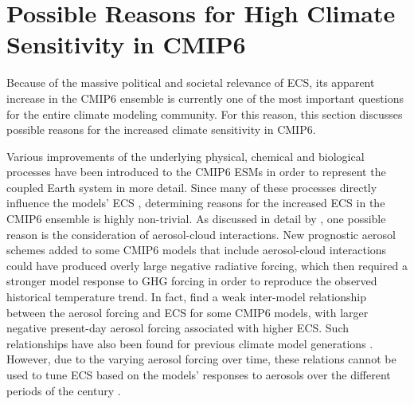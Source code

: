\section{Possible Reasons for High Climate Sensitivity in \acs{CMIP}6}
\label{sec:04:possible_reasons_high_ecs_cmip6}

Because of the massive political and societal relevance of \ac{ECS}, its
apparent increase in the \acs{CMIP}6 ensemble is currently one of the most
important questions for the entire climate modeling community. For this reason,
this section discusses possible reasons for the increased climate sensitivity
in \acs{CMIP}6.

Various improvements of the underlying physical, chemical and biological
processes have been introduced to the \acs{CMIP}6 \acp{ESM} in order to
represent the coupled Earth system in more detail. Since many of these
processes directly influence the models' \ac{ECS} \autocite{Forster2020},
determining reasons for the increased \ac{ECS} in the \acs{CMIP}6 ensemble is
highly non-trivial. As discussed in detail by \textcite{Meehl2020}, one
possible reason is the consideration of aerosol-cloud interactions. New
prognostic aerosol schemes added to some \acs{CMIP}6 models that include
aerosol-cloud interactions could have produced overly large negative radiative
forcing, which then required a stronger model response to \ac{GHG} forcing in
order to reproduce the observed historical temperature trend. In fact,
\textcite{Meehl2020} find a weak inter-model relationship between the aerosol
forcing and \ac{ECS} for some \acs{CMIP}6 models, with larger negative
present-day aerosol forcing associated with higher \ac{ECS}. Such relationships
have also been found for previous climate model generations
\autocite{Kiehl2007, Forster2013}. However, due to the varying aerosol forcing
over time, these relations cannot be used to tune \ac{ECS} based on the models'
responses to aerosols over the different periods of the  century
\autocite{Dittus2020}.

